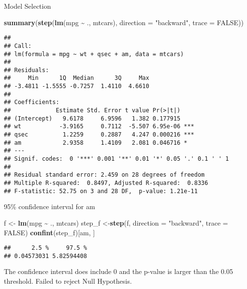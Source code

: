 \documentclass[
]{article}
\newenvironment{Shaded}{\begin{snugshade}}{\end{snugshade}}
\newcommand{\AttributeTok}[1]{\textcolor[rgb]{0.13,0.29,0.53}{#1}}
\newcommand{\ConstantTok}[1]{\textcolor[rgb]{0.56,0.35,0.01}{#1}}
\newcommand{\FunctionTok}[1]{\textcolor[rgb]{0.13,0.29,0.53}{\textbf{#1}}}
\newcommand{\NormalTok}[1]{#1}
\newcommand{\OtherTok}[1]{\textcolor[rgb]{0.56,0.35,0.01}{#1}}
\newcommand{\SpecialCharTok}[1]{\textcolor[rgb]{0.81,0.36,0.00}{\textbf{#1}}}
\newcommand{\StringTok}[1]{\textcolor[rgb]{0.31,0.60,0.02}{#1}}
\begin{document}
Model Selection

\begin{Shaded}
\begin{Highlighting}[]
\FunctionTok{summary}\NormalTok{(}\FunctionTok{step}\NormalTok{(}\FunctionTok{lm}\NormalTok{(mpg }\SpecialCharTok{\textasciitilde{}}\NormalTok{ ., mtcars), }\AttributeTok{direction =} \StringTok{"backward"}\NormalTok{, }\AttributeTok{trace =} \ConstantTok{FALSE}\NormalTok{))}
\end{Highlighting}
\end{Shaded}

\begin{verbatim}
## 
## Call:
## lm(formula = mpg ~ wt + qsec + am, data = mtcars)
## 
## Residuals:
##     Min      1Q  Median      3Q     Max 
## -3.4811 -1.5555 -0.7257  1.4110  4.6610 
## 
## Coefficients:
##             Estimate Std. Error t value Pr(>|t|)    
## (Intercept)   9.6178     6.9596   1.382 0.177915    
## wt           -3.9165     0.7112  -5.507 6.95e-06 ***
## qsec          1.2259     0.2887   4.247 0.000216 ***
## am            2.9358     1.4109   2.081 0.046716 *  
## ---
## Signif. codes:  0 '***' 0.001 '**' 0.01 '*' 0.05 '.' 0.1 ' ' 1
## 
## Residual standard error: 2.459 on 28 degrees of freedom
## Multiple R-squared:  0.8497, Adjusted R-squared:  0.8336 
## F-statistic: 52.75 on 3 and 28 DF,  p-value: 1.21e-11
\end{verbatim}

95\% confidence interval for am

\begin{Shaded}
\begin{Highlighting}[]
\NormalTok{f }\OtherTok{\textless{}{-}} \FunctionTok{lm}\NormalTok{(mpg }\SpecialCharTok{\textasciitilde{}}\NormalTok{ ., mtcars)}
\NormalTok{step\_f }\OtherTok{\textless{}{-}}\FunctionTok{step}\NormalTok{(f, }\AttributeTok{direction =} \StringTok{"backward"}\NormalTok{, }\AttributeTok{trace =} \ConstantTok{FALSE}\NormalTok{)}
\FunctionTok{confint}\NormalTok{(step\_f)[}\StringTok{\textquotesingle{}am\textquotesingle{}}\NormalTok{, ]}
\end{Highlighting}
\end{Shaded}

\begin{verbatim}
##      2.5 %     97.5 % 
## 0.04573031 5.82594408
\end{verbatim}

The confidence interval does include 0 and the p-value is larger than
the 0.05 threshold. Failed to reject Null Hypothesis.
\end{document}
